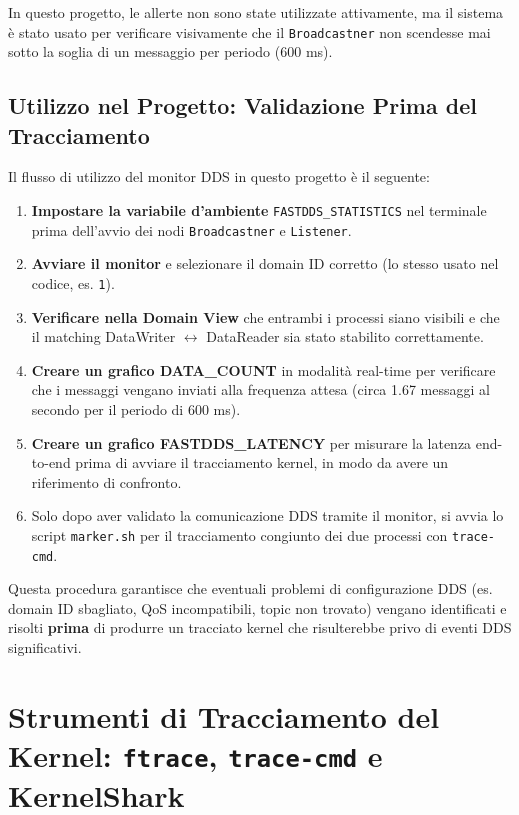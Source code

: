 In questo progetto, le allerte non sono state utilizzate attivamente, ma il sistema è stato usato per verificare visivamente che il \texttt{Broadcastner} non scendesse mai sotto la soglia di un messaggio per periodo (600 ms).
\clearpage
\subsection{Utilizzo nel Progetto: Validazione Prima del Tracciamento}

Il flusso di utilizzo del monitor DDS in questo progetto è il seguente:

\begin{enumerate}
	\item \textbf{Impostare la variabile d'ambiente} \texttt{FASTDDS\_STATISTICS} nel terminale prima dell'avvio dei nodi \texttt{Broadcastner} e \texttt{Listener}.
	\item \textbf{Avviare il monitor} e selezionare il domain ID corretto (lo stesso usato nel codice, es. \texttt{1}).
	\item \textbf{Verificare nella Domain View} che entrambi i processi siano visibili e che il matching DataWriter $\leftrightarrow$ DataReader sia stato stabilito correttamente.
	\item \textbf{Creare un grafico DATA\_COUNT} in modalità real-time per verificare che i messaggi vengano inviati alla frequenza attesa (circa 1.67 messaggi al secondo per il periodo di 600 ms).
	\item \textbf{Creare un grafico FASTDDS\_LATENCY} per misurare la latenza end-to-end prima di avviare il tracciamento kernel, in modo da avere un riferimento di confronto.
	\item Solo dopo aver validato la comunicazione DDS tramite il monitor, si avvia lo script \texttt{marker.sh} per il tracciamento congiunto dei due processi con \texttt{trace-cmd}.
\end{enumerate}

Questa procedura garantisce che eventuali problemi di configurazione DDS (es. domain ID sbagliato, QoS incompatibili, topic non trovato) vengano identificati e risolti \textbf{prima} di produrre un tracciato kernel che risulterebbe privo di eventi DDS significativi.


\clearpage
\section{Strumenti di Tracciamento del Kernel: \texttt{ftrace}, \texttt{trace-cmd} e KernelShark}
\label{sec:tracecmd_kernelshark}



